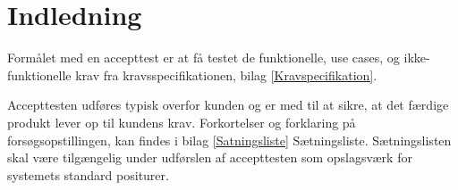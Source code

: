 \chapter{Indledning}\label{Indledning}
Formålet med en accepttest er at få testet de funktionelle, use cases, og ikke-funktionelle krav fra kravsspecifikationen, bilag \ref{Kravspecifikation}. 

Accepttesten udføres typisk overfor kunden og er med til at sikre, at det færdige produkt lever op til kundens krav. Forkortelser og forklaring på forsøgsopstillingen, kan findes i bilag \ref{Satningsliste}  Sætningsliste. Sætningslisten skal være tilgængelig under udførslen af accepttesten som opslagsværk for systemets standard positurer. 